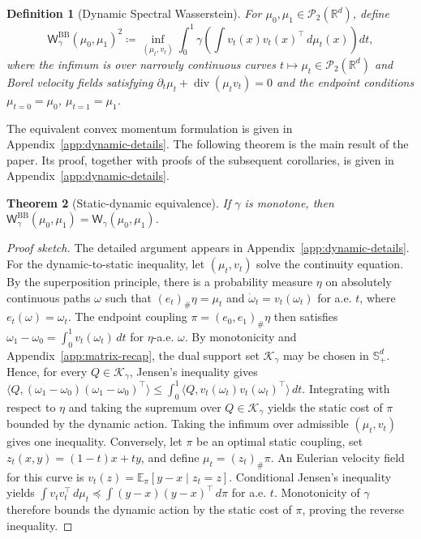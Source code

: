 \documentclass{article}
\newtheorem{theorem}{Theorem}[section]
\newtheorem{definition}[theorem]{Definition}
\newenvironment{proofsketch}{\begin{proof}[Proof sketch]}{\end{proof}}
\newcommand{\R}{\mathbb{R}}
\newcommand{\cP}{\mathcal{P}}
\newcommand{\Wg}{\mathsf{W}_{\gamma}}
\newcommand{\Wgbb}{\mathsf{W}_{\gamma}^{\mathrm{BB}}}
\newcommand{\divv}{\operatorname{div}}
\newcommand{\cK}{\mathcal K_\gamma}
\begin{document}
\begin{definition}[Dynamic Spectral Wasserstein]
\label{def:dynamic}
For $\mu_0,\mu_1\in\cP_2(\R^d)$, define
\begin{equation}
\label{eq:dynamic-spectral-wasserstein}
 \Wgbb(\mu_0,\mu_1)^2
 \coloneqq
 \inf_{(\mu_t,v_t)}
 \int_0^1
 \gamma\!\left(\int v_t(x)v_t(x)^\top\,d\mu_t(x)\right)dt,
\end{equation}
where the infimum is over narrowly continuous curves
$t\mapsto\mu_t\in\cP_2(\R^d)$ and Borel velocity fields satisfying
$\partial_t\mu_t+\divv(\mu_t v_t)=0$ and the endpoint conditions
$\mu_{t=0}=\mu_0$, $\mu_{t=1}=\mu_1$.
\end{definition}
The equivalent convex momentum formulation is given in Appendix~\ref{app:dynamic-details}.
The following theorem is the main result of the paper. Its proof, together
with proofs of the subsequent corollaries, is given in
Appendix~\ref{app:dynamic-details}.


\begin{theorem}[Static-dynamic equivalence]
\label{thm:staticdynamic}
If $\gamma$ is monotone, then
$\Wgbb(\mu_0,\mu_1)=\Wg(\mu_0,\mu_1)$.
\end{theorem}


\begin{proofsketch}
The detailed argument appears in Appendix~\ref{app:dynamic-details}. For the
dynamic-to-static inequality, let $(\mu_t,v_t)$ solve the continuity equation.
By the superposition principle, there is a probability measure $\eta$ on
absolutely continuous paths $\omega$ such that
$(e_t)_\#\eta=\mu_t$ and
$\dot\omega_t=v_t(\omega_t)$ for a.e. $t$, where
$e_t(\omega)=\omega_t$. The endpoint coupling
$\pi=(e_0,e_1)_\#\eta$ then satisfies
$\omega_1-\omega_0=\int_0^1v_t(\omega_t)\,dt$ for $\eta$-a.e. $\omega$.
%
By monotonicity and Appendix~\ref{app:matrix-recap}, the dual support set
$\cK$ may be chosen in $\mathbb S_+^d$. Hence, for every $Q\in\cK$, Jensen's
inequality gives
$\langle Q,(\omega_1-\omega_0)(\omega_1-\omega_0)^\top\rangle
\le \int_0^1 \langle Q,v_t(\omega_t)v_t(\omega_t)^\top\rangle\,dt$.
Integrating with respect to $\eta$ and taking the supremum over $Q\in\cK$
yields the static cost of $\pi$ bounded by the dynamic action. Taking the
infimum over admissible $(\mu_t,v_t)$ gives one inequality.
%
Conversely, let $\pi$ be an optimal static coupling, set
$z_t(x,y)=(1-t)x+ty$, and define $\mu_t=(z_t)_\#\pi$. An Eulerian velocity
field for this curve is $v_t(z)=\mathbb E_\pi[y-x\mid z_t=z]$.
Conditional Jensen's inequality yields
$\int v_t v_t^\top\,d\mu_t\preceq\int (y-x)(y-x)^\top\,d\pi$
for a.e. $t$.
Monotonicity of $\gamma$ therefore bounds the dynamic action by the static
cost of $\pi$, proving the reverse inequality.
\end{proofsketch}
\end{document}
